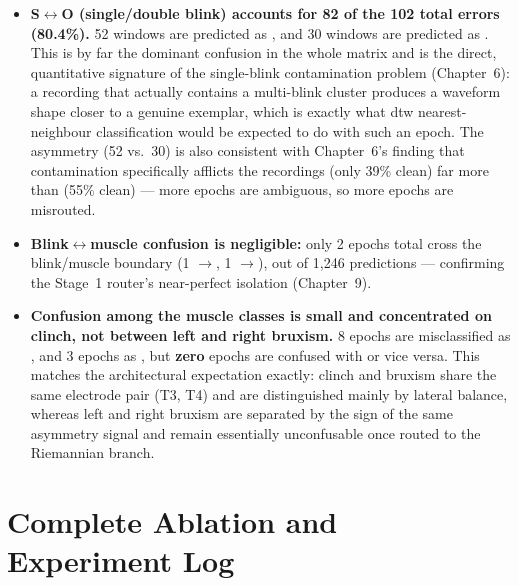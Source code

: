 \begin{itemize}[leftmargin=*]
    \item \textbf{S$\leftrightarrow$O (single/double blink) accounts
    for 82 of the 102 total errors (80.4\%).} 52
     windows are predicted as
    , and 30  windows are
    predicted as . This is by far the dominant
    confusion in the whole matrix and is the direct, quantitative
    signature of the single-blink contamination problem
    (Chapter~6): a  recording that actually
    contains a multi-blink cluster produces a waveform shape closer
    to a genuine  exemplar, which is exactly
    what \acrshort{dtw} nearest-neighbour classification would be
    expected to do with such an epoch. The asymmetry (52 vs.\ 30)
    is also consistent with Chapter~6's finding that contamination
    specifically afflicts the  recordings
    (only 39\% clean) far more than 
    (55\% clean) --- more  epochs are
    ambiguous, so more  epochs are misrouted.
    \item \textbf{Blink$\leftrightarrow$muscle confusion is
    negligible:} only 2 epochs total cross the blink/muscle
    boundary (1 $\rightarrow$, 1
    $\rightarrow$), out of
    1{,}246 predictions --- confirming the Stage~1 router's
    near-perfect isolation (Chapter~9).
    \item \textbf{Confusion among the muscle classes is small and
    concentrated on clinch, not between left and right bruxism.}
    8  epochs are misclassified as
    , and 3  epochs as
    , but \textbf{zero}  epochs
    are confused with  or vice versa. This
    matches the architectural expectation exactly: clinch and
    bruxism share the same electrode pair (T3, T4) and are
    distinguished mainly by lateral balance, whereas left and right
    bruxism are separated by the sign of the same asymmetry signal
    and remain essentially unconfusable once routed to the
    Riemannian branch.
\end{itemize}

\section{Complete Ablation and Experiment Log}
\label{sec:res_ablation}

